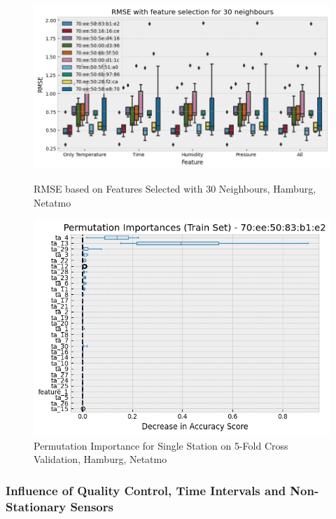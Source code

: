 \begin{figure}[htp]
    \centering
    \includegraphics[width=1\textwidth]{images/rmse_30_neighbours_feature_importance_by_pid.png}
    \caption{RMSE based on Features Selected with 30 Neighbours, Hamburg, Netatmo}
    \label{fig:eval feature importance 10 stations single location}

    \centering
    \includegraphics[width=1\textwidth]{images/rmse_30_neighbours_permutation_importance_by_pid.png}
    \caption{Permutation Importance for Single Station on 5-Fold Cross Validation, Hamburg, Netatmo}
    \label{fig:eval permutation importance single station}
\end{figure}

\subsubsection{Influence of Quality Control, Time Intervals and Non-Stationary Sensors}

